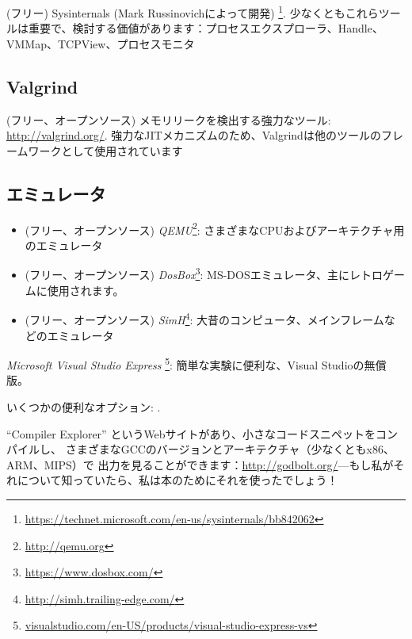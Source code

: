 (フリー) Sysinternals (Mark Russinovichによって開発)
\footnote{\url{https://technet.microsoft.com/en-us/sysinternals/bb842062}}.
少なくともこれらツールは重要で、検討する価値があります：プロセスエクスプローラ、Handle、VMMap、TCPView、プロセスモニタ

\subsection{Valgrind}

(フリー、オープンソース) メモリリークを検出する強力なツール: \url{http://valgrind.org/}.
強力な\ac{JIT}メカニズムのため、Valgrindは他のツールのフレームワークとして使用されています


\subsection{エミュレータ}

\begin{itemize}
\item (フリー、オープンソース) \emph{QEMU}\footnote{\url{http://qemu.org}}: さまざまなCPUおよびアーキテクチャ用のエミュレータ

\item (フリー、オープンソース) \emph{DosBox}\footnote{\url{https://www.dosbox.com/}}: MS-DOSエミュレータ、主にレトロゲームに使用されます。

\item (フリー、オープンソース) \emph{SimH}\footnote{\url{http://simh.trailing-edge.com/}}: 大昔のコンピュータ、メインフレームなどのエミュレータ
\end{itemize}


\emph{Microsoft Visual Studio Express}
\footnote{\href{http://www.microsoft.com/express/Downloads/}{visualstudio.com/en-US/products/visual-studio-express-vs}}:
簡単な実験に便利な、Visual Studioの無償版。

いくつかの便利なオプション: .

``Compiler Explorer'' というWebサイトがあり、小さなコードスニペットをコンパイルし、
さまざまなGCCのバージョンとアーキテクチャ（少なくともx86、ARM、MIPS）で
出力を見ることができます：\url{http://godbolt.org/}---もし私がそれについて知っていたら、私は本のためにそれを使ったでしょう！


